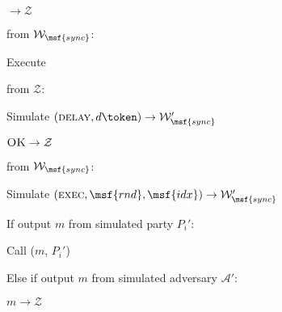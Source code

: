 \begin{bbox}[title={Simulator $\mathcal{S}_\msf{Bracha} (\mathcal{D}, \mathcal{P}, \Delta)$}]
\begin{renumerate}
	\item \Send {} $\rightarrow \mathcal{Z}$
	\end{renumerate}

\OnInput {} from $\mathcal{W}_\msf{sync}$:
	\begin{renumerate}
	\item Execute 
	\end{renumerate}

\OnInput {} from $\mathcal{Z}$:
	\begin{renumerate}
	\item Simulate $(\textsc{delay}, d \token) \rightarrow \mathcal{W}_\msf{sync}'$



	\item \Send $\textsc{OK} \rightarrow \mathcal{Z}$
	\end{renumerate}

\OnInput {} from $\mathcal{W}_\msf{sync}$:
	\begin{renumerate}
	\item Simulate $(\textsc{exec}, \msf{rnd}, \msf{idx}) \rightarrow \mathcal{W}_\msf{sync}'$


	\item If output $m$ from simulated party $P_i'$:


		\quad Call ($m$, $P_i'$)

	\item Else if output $m$ from simulated adversary $\mathcal{A}'$:

		\quad \Send $m \rightarrow \mathcal{Z}$

%
%
%  
%
%
%
	\end{renumerate}

\end{bbox}

